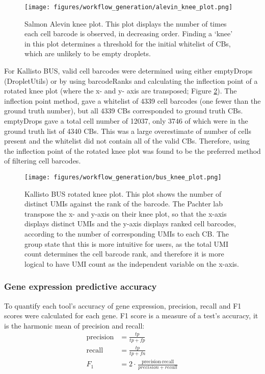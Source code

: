 \begin{figure}[htb]
    \centering
    \texttt{[image: figures/workflow\_generation/alevin\_knee\_plot.png]}
    \caption[Salmon Alevin knee plot]{Salmon Alevin knee plot.
    This plot displays the number of times each cell barcode is observed, in decreasing order.
    Finding a `knee' in this plot determines a threshold for the initial whitelist of CBs, which are unlikely to be empty droplets.}
    \label{fig:alevin_knee}
\end{figure}

For Kallisto BUS, valid cell barcodes were determined using either emptyDrops (DropletUtils) or by
using barcodeRanks and calculating the inflection point of a rotated knee plot (where the x- and y- axis are transposed; Figure \ref{fig:bus_knee}).
The inflection point method, gave a whitelist of 4339 cell barcodes (one fewer than the ground truth number), but all 4339 CBs corresponded to ground truth CBs.
emptyDrops gave a total cell number of 12037, only 3746 of which were in the ground truth list of 4340 CBs. This was a large overestimate of number of cells present and the whitelist did not contain all of the valid CBs.
Therefore, using the inflection point of the rotated knee plot was found to be the preferred method of filtering cell barcodes.

\begin{figure}[htb]
    \centering
    \texttt{[image: figures/workflow\_generation/bus\_knee\_plot.png]}
    \caption[Kallisto BUS rotated knee plot]{Kallisto BUS rotated knee plot.
    This plot shows the number of distinct UMIs against the rank of the barcode.
    The Pachter lab transpose the x- and y-axis on their knee plot, so that the x-axis displays distinct UMIs and the y-axis displays ranked cell barcodes, according to the number of corresponding UMIs to each CB.
    The group state that this is more intuitive for users, as the total UMI count determines the cell barcode rank, and therefore it is more logical to have UMI count as the independent variable on the x-axis.}
    \label{fig:bus_knee}
\end{figure}

\subsubsection{Gene expression predictive accuracy}
To quantify each tool's accuracy of gene expression, precision, recall and F1 scores were calculated for each gene.
F1 score is a measure of a test's accuracy, it is the harmonic mean of precision and recall:
\begin{equation}
\begin{aligned}
\text{precision} & = \frac{tp}{tp + fp}\\
%
\text{recall} & = \frac{tp}{tp + fn}\\
%
F_{1} & = 2 \cdot \frac{\text{precision} \cdot \text{recall}}{precision + recall}
\end{aligned}
\end{equation}

